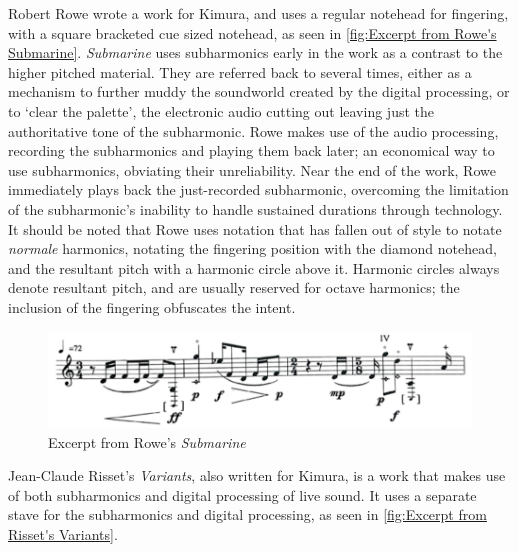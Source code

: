 Robert Rowe wrote a work for Kimura, and uses a regular notehead for fingering, with a square bracketed cue sized notehead, as seen in \autoref{fig:Excerpt from Rowe's Submarine}.\autocite[]{roweSubmarine1996}
\emph{Submarine} uses subharmonics early in the work as a contrast to the higher pitched material.
They are referred back to several times, either as a mechanism to further muddy the soundworld created by the digital processing, or to `clear the palette', the electronic audio cutting out leaving just the authoritative tone of the subharmonic.
Rowe makes use of the audio processing, recording the subharmonics and playing them back later; an economical way to use subharmonics, obviating their unreliability.
Near the end of the work, Rowe immediately plays back the just-recorded subharmonic, overcoming the limitation of the subharmonic's inability to handle sustained durations through technology. 
It should be noted that Rowe uses notation that has fallen out of style to notate \emph{normale} harmonics, notating the fingering position with the diamond notehead, and the resultant pitch with a harmonic circle above it. 
Harmonic circles always denote resultant pitch, and are usually reserved for octave harmonics; the inclusion of the fingering obfuscates the intent.\autocite[420]{gouldBars2011}

\begin{figure}
  \includegraphics[width=\linewidth]{./resources/roweALFExcerpt.pdf}
  \caption{Excerpt from Rowe's \emph{Submarine}}\label{fig:Excerpt from Rowe's Submarine}\end{figure}

Jean-Claude Risset's \emph{Variants}, also written for Kimura, is a work that makes use of both subharmonics and digital processing of live sound.\autocite[]{rissetVariants1995}
It uses a separate stave for the subharmonics and digital processing, as seen in \autoref{fig:Excerpt from Risset's Variants}. 

